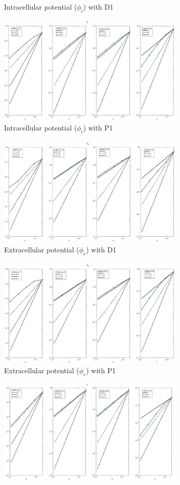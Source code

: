 \documentclass[a4paper,11pt]{article}
\begin{document}
\begin{figure}[h]
\begin{subfigure}{0.5\textwidth}
\caption{Intracellular potential ($\phi_i$) with D1}
\end{subfigure}
\hfill
\begin{subfigure}{0.5\textwidth}
\includegraphics[width =9cm]{./P1_Phii_1.jpg}
\caption{Intracellular potential ($\phi_i$) with P1}
\end{subfigure}
\begin{subfigure}{0.5\textwidth}
\includegraphics[width = 9cm]{./D1_Phie_1.jpg}
\caption{Extracellular potential ($\phi_e$) with D1}
\end{subfigure}
\begin{subfigure}{0.5\textwidth}
\includegraphics[width =9cm]{./P1_Phie_1.jpg}
\caption{Extracellular potential ($\phi_e$) with P1}
\end{subfigure}
\begin{subfigure}{0.5\textwidth}
\includegraphics[width = 9cm]{./D1_w_1.jpg}

\end{subfigure}
\end{figure}
\end{document}
